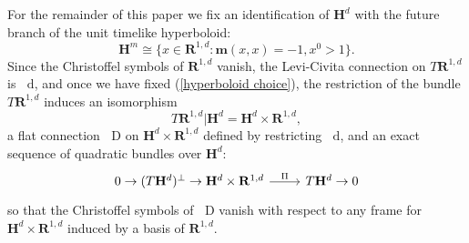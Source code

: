 \documentclass[reqno,10pt]{amsart}
\newcommand{\RR}{\mathbf{R}}
\newcommand{\Hyp}{\mathbf H}
\newcommand{\Mink}{\mathbf m}
\newcommand*\dif{\mathop{}\!\mathrm{d}}
\newcommand*\Dif{\mathop{}\!\mathrm{D}}
\newcommand{\dfn}[1]{\emph{#1}\index{#1}}
\theoremstyle{definition}
\newtheorem{definition}[theorem]{Definition}
\numberwithin{equation}{section}
\begin{document}
For the remainder of this paper we fix an identification of $\Hyp^d$ with the future branch of the unit timelike hyperboloid:
\begin{equation}\label{hyperboloid choice}
\Hyp^m \cong \{x \in \RR^{1,d}: \Mink(x, x) = -1, x^0 > 1\}.
\end{equation}
Since the Christoffel symbols of $\RR^{1,d}$ vanish, the Levi-Civita connection on $T\RR^{1, d}$ is $\dif$, and once we have fixed (\ref{hyperboloid choice}), the restriction of the bundle $T\RR^{1, d}$ induces an isomorphism
$$T\RR^{1, d}|\Hyp^d = \Hyp^d \times \RR^{1, d},$$
a flat connection $\Dif$ on $\Hyp^d \times \RR^{1, d}$ defined by restricting $\dif$, and an exact sequence of quadratic bundles over $\Hyp^d$:
$$\begin{tikzcd}
0 \to (T\Hyp^d)^\perp \to \Hyp^d \times \RR^{1, d} \arrow[r,"\Pi"] & T\Hyp^d \to 0
\end{tikzcd}$$
so that the Christoffel symbols of $\Dif$ vanish with respect to any frame for $\Hyp^d \times \RR^{1, d}$ induced by a basis of $\RR^{1, d}$.
%
%
%
%
\end{document}
